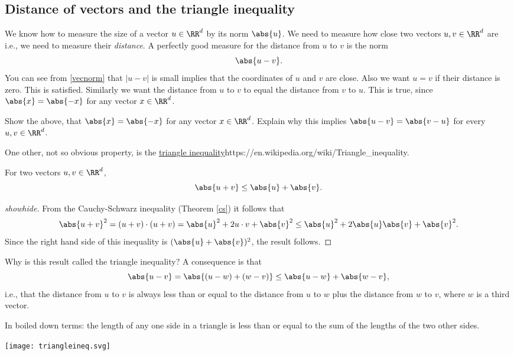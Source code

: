 \documentclass{article}
\begin{document}
\subsection{Distance of vectors and the triangle inequality}

We know how to measure the size of a vector $u\in \RR^d$ by its norm $\abs{u}$. We need
to measure how close two vectors $u, v\in \RR^d$ are i.e., we
need to measure their \emph{distance}. A perfectly good
measure for the distance from $u$ to $v$ is the norm
$$
\abs{u-v}.
$$
You can see from \eqref{vecnorm} that $|u-v|$ is small implies that
the coordinates of $u$ and $v$ are close. Also we want $u = v$ if
their distance is zero. This is satisfied. Similarly we want
the distance from $u$ to $v$ to equal the distance from $v$ to $u$. This is true,
since $\abs{x} = \abs{-x}$ for any vector $x\in \RR^d$.

\beginshex
Show the above, that $\abs{x} = \abs{-x}$ for any vector $x\in \RR^d$. Explain why
this implies $\abs{u - v} = \abs{v - u}$ for every $u, v\in \RR^d$.
\endshex

One other, not so obvious property, is the \url{triangle inequality}{https://en.wikipedia.org/wiki/Triangle_inequality}.

\begin{theorem}\label{thmtrineq}
  For two vectors $u, v\in \RR^d$,
  $$
  \abs{u + v} \leq \abs{u} + \abs{v}.
  $$
  \end{theorem}
    \begin{proof}[showhide]
      From the Cauchy-Schwarz inequality (Theorem \ref{cs}) it follows that 
      $$
      \abs{u+v}^2 = (u+v)\cdot (u+v) = \abs{u}^2 + 2 u\cdot v + \abs{v}^2 \leq \abs{u}^2 + 2 \abs{u}\abs{v} + \abs{v}^2.
      $$
      Since the right hand side of this inequality is $(\abs{u} + \abs{v})^2$, the result follows.
    \end{proof}

  Why is this result called the triangle inequality? A consequence is that
  $$
  \abs{u - v}  = \abs{(u - w) + (w - v)} \leq \abs{u - w} + \abs{w - v},
  $$
  i.e., that the distance from $u$ to $v$ is always less than or equal to
  the distance from $u$ to $w$ plus the distance from $w$ to $v$, where
  $w$ is a third vector.

  In boiled down terms: the length of any one side in a triangle is
  less than or equal to the sum of the lengths of the two other sides.


\texttt{[image: triangleineq.svg]}
\end{document}
